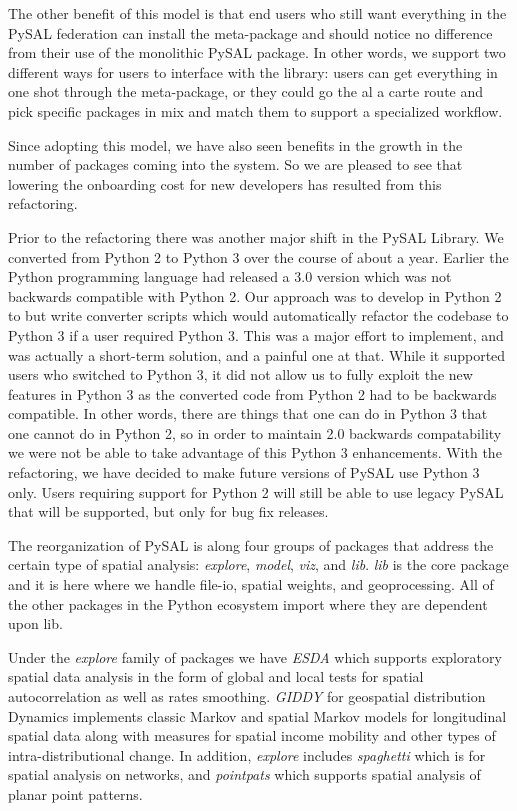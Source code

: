 \documentclass[11pt]{article}
\begin{document}
The other benefit of this model is that end users who still want everything in
the PySAL federation can install the meta-package and should notice no
difference from their use of the monolithic PySAL package. In other words, we
support two different ways for users to interface with the library: users can
get everything in one shot through the meta-package, or they could go the al a
carte route and pick specific packages in mix and match them to support a
specialized workflow.

Since adopting this model, we have also seen benefits in the growth in the number
of packages coming into the system. So we are pleased to see that  lowering the
onboarding cost for new developers has resulted from this refactoring.


Prior to the refactoring there was another major shift in the PySAL Library. We
converted from Python 2 to Python 3 over the course of about a year. Earlier the
Python programming language had released a 3.0 version which was not backwards
compatible with Python 2. Our approach was to develop in Python 2 to but write
converter scripts which would automatically refactor the codebase to Python 3
if a user required Python 3. This was a major effort to implement, and was
actually a short-term solution, and a painful one at that. While it supported
users who switched to Python 3, it did not allow us to fully exploit the new
features in Python 3 as the converted code from Python 2  had to be backwards
compatible. In other words, there are things that one can do in Python 3 that
one cannot do in Python 2, so in order to maintain 2.0 backwards compatability
we were not be able to take advantage of this Python 3 enhancements. With the
refactoring, we have decided to make future versions of PySAL use Python 3 only. Users
requiring support for Python 2 will still be able to use legacy PySAL that
will be supported, but only for bug fix releases.


The reorganization of PySAL is along four groups of packages that address the
certain type of spatial analysis: \emph{explore}, \emph{model}, \emph{viz}, and \emph{lib}. \emph{lib} is the core
package and it is here where we handle file-io, spatial weights, and
geoprocessing. All of the other packages in the Python ecosystem import where
they are dependent upon lib.

Under the \emph{explore} family of packages we have \emph{ESDA} which supports exploratory
spatial data analysis in the form of global and local tests for spatial
autocorrelation as well as rates smoothing. \emph{GIDDY} for geospatial distribution
Dynamics implements classic Markov and spatial Markov models for longitudinal
spatial data along with measures for spatial income mobility and other types of
intra-distributional change. In addition, \emph{explore} includes \emph{spaghetti} which is
for spatial analysis on networks, and \emph{pointpats} which supports spatial analysis
of planar point patterns.
\end{document}
